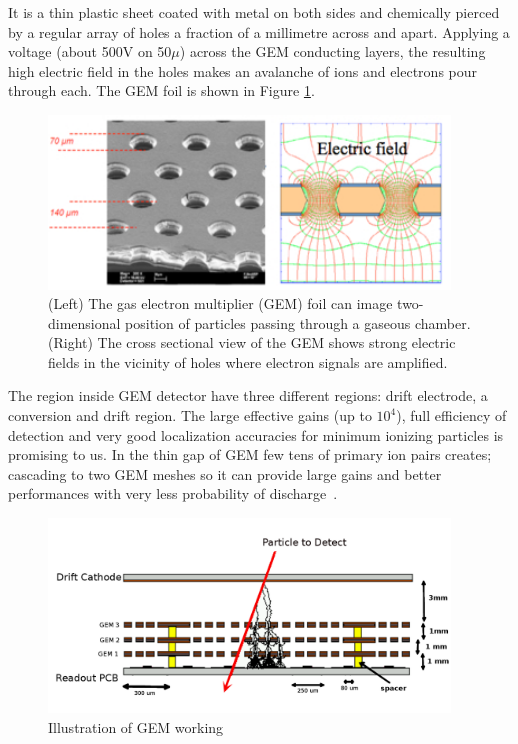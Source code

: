 It is a thin plastic sheet coated with metal on both sides and chemically pierced by a regular array of holes a fraction of a millimetre across and apart. Applying a voltage (about 500V on 50$\mu$) across the GEM conducting layers, the resulting high electric field in the holes makes an avalanche of ions and electrons pour through each. The GEM foil is shown in Figure \ref{fig:gem}.
\begin{figure}[!htbp]
	\centering
	\includegraphics[width=0.95\textwidth]{figures/GEM/KEKDTP3.jpg}
	\caption{(Left) The gas electron multiplier (GEM) foil can image two-dimensional position of particles passing through a gaseous chamber. (Right) The cross sectional view of the GEM shows strong electric fields in the vicinity of holes where electron signals are amplified.}
	\label{fig:gem}
\end{figure}
The region inside GEM detector have three different regions: drift electrode, a conversion and drift region.
The large effective gains (up to $10^4$), full efficiency of detection and very good localization accuracies for minimum ionizing particles is promising to us. In the thin gap of GEM few tens of primary ion pairs creates; cascading to two GEM meshes so it can provide large gains and better performances with very less probability of discharge~\cite{Bressan1999}.
\begin{figure}[!htbp]
	\begin{center}
		\includegraphics[width=0.95\textwidth]{figures/GEM/triple_gem.png}
		\caption{Illustration of GEM working}
		\label{fig:gemgaps}
	\end{center}
\end{figure} 
